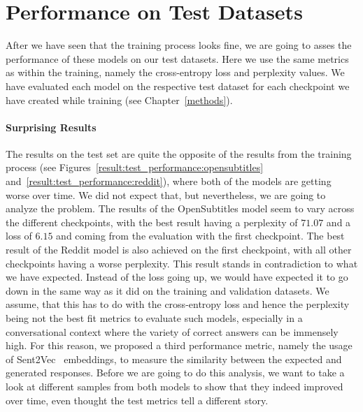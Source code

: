 \section{Performance on Test Datasets}
After we have seen that the training process looks fine, we are going to asses the performance of these models on our test datasets. Here we use the same metrics as within the training, namely the cross-entropy loss and perplexity values. We have evaluated each model on the respective test dataset for each checkpoint we have created while training (see Chapter~\ref{methods}).

\paragraph{Surprising Results} The results on the test set are quite the opposite of the results from the training process (see Figures~\ref{result:test_performance:opensubtitles} and~\ref{result:test_performance:reddit}), where both of the models are getting worse over time. We did not expect that, but nevertheless, we are going to analyze the problem. The results of the OpenSubtitles model seem to vary across the different checkpoints, with the best result having a perplexity of $71.07$ and a loss of $6.15$ and coming from the evaluation with the first checkpoint. The best result of the Reddit model is also achieved on the first checkpoint, with all other checkpoints having a worse perplexity. This result stands in contradiction to what we have expected. Instead of the loss going up, we would have expected it to go down in the same way as it did on the training and validation datasets. We assume, that this has to do with the cross-entropy loss and hence the perplexity being not the best fit metrics to evaluate such models, especially in a conversational context where the variety of correct answers can be immensely high. For this reason, we proposed a third performance metric, namely the usage of Sent2Vec~\cite{Pgj:2017} embeddings, to measure the similarity between the expected and generated responses. Before we are going to do this analysis, we want to take a look at different samples from both models to show that they indeed improved over time, even thought the test metrics tell a different story.

